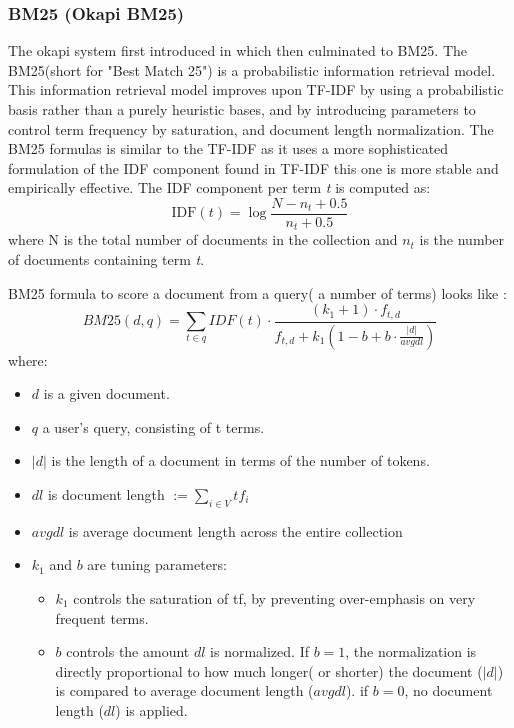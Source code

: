 \subsubsection{BM25 (Okapi BM25)}
The okapi system first introduced in\cite{Bm25foundation} which then culminated to BM25. The BM25(short for "Best Match 25") is a probabilistic information retrieval model. This information retrieval model improves upon TF-IDF by using a probabilistic basis rather than a purely heuristic bases, and by introducing parameters to control term frequency by saturation, and document length normalization.
The BM25 formulas is similar to the TF-IDF as it uses a more sophisticated formulation of the IDF component found in TF-IDF this one is more stable and empirically effective. The IDF component per term \textit{t} is computed as:
\begin{equation}
    \label{eq:idfbm25}
    \text{IDF}(t) = \log \frac{N-n_t+0.5}{n_t+0.5}
\end{equation}
where N is the total number of documents in the collection and $n_t$ is the number of documents containing term \textit{t}.

BM25 formula to score a document from a query( a number of terms) looks like \cite{bm25}:
\begin{equation}
    \label{eq:bm25}
    \textit{BM25}(d,q) = \sum_{t \in q} IDF(t) \cdot \frac{(k_1+1)\cdot f_{t,d}}{f_{t,d}+k_1(1-b+b \cdot \frac{|d|}{avgdl})}
\end{equation}
where:
\begin{itemize}
\item $d$ is a given document.
\item $q$ a user's query, consisting of t terms.
\item $|d|$ is the length of a document in terms of the number of tokens.
\item $dl$ is document length $:=\sum_{i \in V}{tf}_i$
\item $avgdl$ is average document length across the entire collection
\item $k_1$ and $b$ are tuning parameters:
\begin{itemize}
    \item $k_1$ controls  the saturation of \gls{tf}, by preventing over-emphasis on very frequent terms.
    \item $b$ controls the amount $dl$ is normalized. If $b = 1$, the normalization is directly proportional to how much longer( or shorter) the document ($|d|$) is compared to average document length ($avgdl$). if $b=0$, no document length ($dl$) is applied.
\end{itemize}
\end{itemize}

